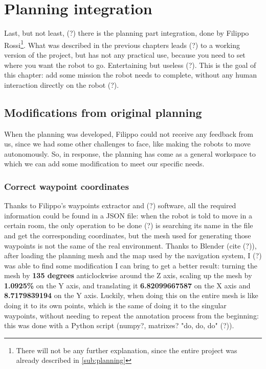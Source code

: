 \chapter{Planning integration}

Last, but not least, (?) there is the planning part integration, done by Filippo Rossi\footnote{There will not be any further explanation, since the entire project was already described in \autoref{sub:planning}}. What was described in the previous chapters leads (?) to a working version of the project, but has not any practical use, because you need to set where you want the robot to go. Entertaining but useless (?). This is the goal of this chapter: add some mission the robot needs to complete, without any human interaction directly on the robot (?).

\section{Modifications from original planning}

When the planning was developed, Filippo could not receive any feedback from us, since we had some other challenges to face, like making the robots to move autonomously. So, in response, the planning has come as a general workspace to which we can add some modification to meet our specific needs.

\subsection*{Correct waypoint coordinates}

Thanks to Filippo's waypoints extractor and  (?) software, all the required information could be found in a JSON file: when the robot is told to move in a certain room, the only operation to be done (?) is searching its name in the file and get the corresponding coordinates, but the mesh used for generating those waypoints is not the same of the real environment.
Thanks to Blender (cite (?)), after loading the planning mesh and the map used by the navigation system, I (?) was able to find some modification I can bring to get a better result: turning the mesh by {\bf 135 degrees} anticlockwise around the Z axis, scaling up the mesh by {\bf 1.0925\%} on the Y axis, and translating it {\bf 6.82099667587} on the X axis and {\bf 8.7179839194} on the Y axis. Luckily, when doing this on the entire mesh is like doing it to its own points, which is the same of doing it to the singular waypoints, without needing to repeat the annotation process from the beginning: this was done with a Python script (numpy?, matrixes? "do, do, do" (?)).

